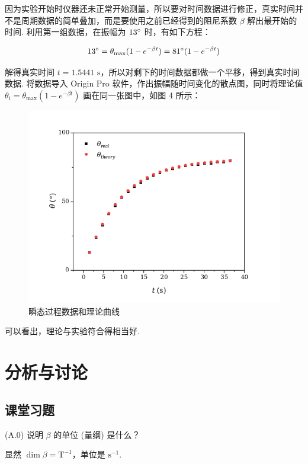 \documentclass{THUexprep}
\begin{document}
因为实验开始时仪器还未正常开始测量，所以要对时间数据进行修正，真实时间并不是周期数据的简单叠加，而是要使用之前已经得到的阻尼系数 $\beta$ 解出最开始的时间. 利用第一组数据，在振幅为 $13\degree$ 时，有如下方程：

\begin{equation}
    13\degree = \theta_{\max}(1-e^{-\beta t}) = 81\degree(1-e^{-\beta t})
\end{equation}

解得真实时间 $t=1.5441\text{ s}$，所以对剩下的时间数据都做一个平移，得到真实时间数据. 将数据导入 Origin Pro 软件，作出振幅随时间变化的散点图，同时将理论值 $\theta_i=\theta_{\max}(1-e^{-\beta t})$ 画在同一张图中，如图 4 所示：

\begin{figure}[h]
    \centering
    \includegraphics[scale=0.5]{shuntai.png}
    \caption{瞬态过程数据和理论曲线}
    \label{fig:shuntai}
\end{figure}

可以看出，理论与实验符合得相当好.

\section{分析与讨论}

\subsection{课堂习题}

(A.0) 说明 $\beta$ 的单位 (量纲) 是什么？

显然 $\dim{\beta}=\text{T}^{-1}$，单位是 $\text{s}^{-1}$.
\end{document}

